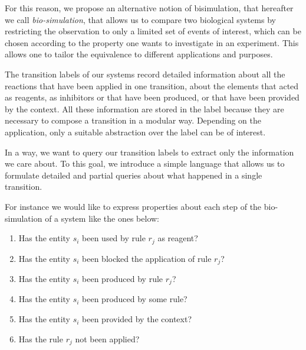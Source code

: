 For this reason, we propose an alternative notion of bisimulation, that hereafter we call \emph{bio-simulation},
that allows us  to compare two biological systems by restricting the observation to only a limited set of events of interest, which can be chosen according to the property one wants to investigate in an experiment.
This allows one to tailor the equivalence to different applications and purposes. 

The transition labels of our systems record detailed information about all the reactions that have been applied in one transition, about the elements that acted as reagents, as inhibitors or that have been produced, or that have been provided by the context.
All these information are stored in the label because they are necessary to compose a transition in a modular way. Depending on the application, only a suitable abstraction over the label can be of interest.

In a way, we want to query our transition labels to extract only the information we care about.
To this goal, we introduce a simple language
that allows us to formulate detailed and partial queries about what happened in a single transition.

\begin{example} \label{properties_ex}
For instance we would like to express properties about each step of the bio-simulation of a system like the ones below:
\begin{enumerate}
\item Has the entity $s_i$ been used by rule $r_j$ as reagent?
\item Has the entity $s_i$ been blocked the application of  rule $r_j$?
\item Has the entity $s_i$ been produced by rule $r_j$?
\item Has the entity $s_i$ been produced by some rule?
\item Has the entity $s_i$ been provided by the context? 
\item Has the rule $r_j$ not been applied? 
\end{enumerate}
\end{example}

